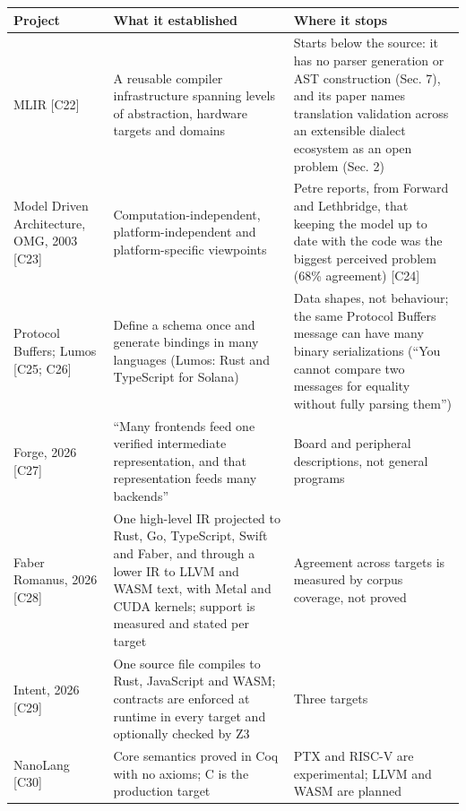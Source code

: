 \documentclass[10pt,letterpaper]{article}
\begin{document}
{\footnotesize\setlength{\tabcolsep}{3.8pt}\renewcommand{\arraystretch}{1.15}
\begin{longtable}[]{@{}
  >{\raggedright\arraybackslash}p{}
  >{\raggedright\arraybackslash}p{}
  >{\raggedright\arraybackslash}p{}@{}}
\toprule\noalign{}
\begin{minipage}[b]{\linewidth}\raggedright
\textbf{Project}
\end{minipage} & \begin{minipage}[b]{\linewidth}\raggedright
\textbf{What it established}
\end{minipage} & \begin{minipage}[b]{\linewidth}\raggedright
\textbf{Where it stops}
\end{minipage} \\
\midrule\noalign{}
\endhead
\bottomrule\noalign{}
\endlastfoot
MLIR {[}C22{]} & A reusable compiler infrastructure spanning levels of
abstraction, hardware targets and domains & Starts below the source: it
has no parser generation or AST construction (Sec. 7), and its paper
names translation validation across an extensible dialect ecosystem as
an open problem (Sec. 2) \\
Model Driven Architecture, OMG, 2003 {[}C23{]} &
Computation-independent, platform-independent and platform-specific
viewpoints & Petre reports, from Forward and Lethbridge, that keeping
the model up to date with the code was the biggest perceived problem
(68\% agreement) {[}C24{]} \\
Protocol Buffers; Lumos {[}C25; C26{]} & Define a schema once and
generate bindings in many languages (Lumos: Rust and TypeScript for
Solana) & Data shapes, not behaviour; the same Protocol Buffers message
can have many binary serializations (``You cannot compare two messages
for equality without fully parsing them'') \\
Forge, 2026 {[}C27{]} & ``Many frontends feed one verified intermediate
representation, and that representation feeds many backends'' & Board
and peripheral descriptions, not general programs \\
Faber Romanus, 2026 {[}C28{]} & One high-level IR projected to Rust, Go,
TypeScript, Swift and Faber, and through a lower IR to LLVM and WASM
text, with Metal and CUDA kernels; support is measured and stated per
target & Agreement across targets is measured by corpus coverage, not
proved \\
Intent, 2026 {[}C29{]} & One source file compiles to Rust, JavaScript
and WASM; contracts are enforced at runtime in every target and
optionally checked by Z3 & Three targets \\
NanoLang {[}C30{]} & Core semantics proved in Coq with no axioms; C is
the production target & PTX and RISC-V are experimental; LLVM and WASM
are planned \\
\end{longtable}
}
\end{document}

